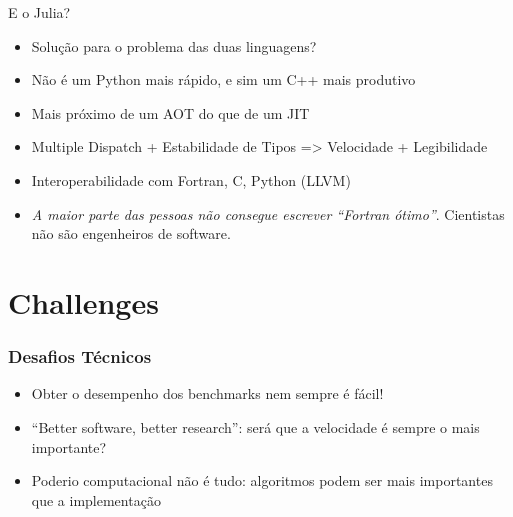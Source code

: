 \documentclass{beamer}
\begin{document}
\begin{darkframes}
  \begin{frame}{E o Julia?}
      \begin{itemize}
         \item<1-> Solução para o problema das duas linguagens?
         \item<2-> Não é um Python mais rápido, e sim um C++ mais produtivo
         \item<3-> Mais próximo de um AOT do que de um JIT
         \item<4-> Multiple Dispatch + Estabilidade de Tipos => Velocidade + Legibilidade
         \item<5-> Interoperabilidade com Fortran, C, Python (LLVM)
         \item<6-> \emph{A maior parte das pessoas não consegue escrever “Fortran ótimo”}. Cientistas não são engenheiros de software.
      \end{itemize}
    \vfill
   \end{frame}

  \section{Challenges}
  \begin{frame}
    \frametitle{Desafios Técnicos}
    \begin{itemize}
    \item<2-> Obter o desempenho dos benchmarks nem sempre é fácil!
    \item<3-> ``Better software, better research'': será que a velocidade é sempre o mais importante?
    \item<4-> Poderio computacional não é tudo: algoritmos podem ser mais importantes que a implementação
    \end{itemize}
  \end{frame}


\end{darkframes}
\end{document}
